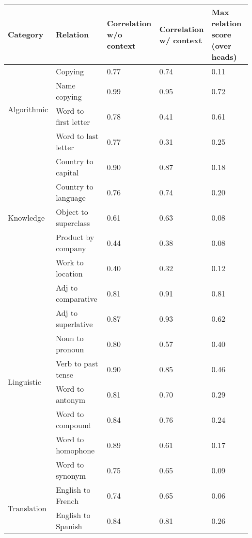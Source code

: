 \begin{tabular}{lllll}
\toprule
Category & Relation & \makecell{Correlation\\w/o context} & \makecell{Correlation\\w/ context} & \makecell{Max relation score\\(over heads)} \\
\midrule
\multirow{4}{*}{Algorithmic} & Copying & 0.77 & 0.74 & 0.11 \\
 & Name copying & 0.99 & 0.95 & 0.72 \\
 & Word to first letter & 0.78 & 0.41 & 0.61 \\
 & Word to last letter & 0.77 & 0.31 & 0.25 \\
\multirow{5}{*}{Knowledge} & Country to capital & 0.90 & 0.87 & 0.18 \\
 & Country to language & 0.76 & 0.74 & 0.20 \\
 & Object to superclass & 0.61 & 0.63 & 0.08 \\
 & Product by company & 0.44 & 0.38 & 0.08 \\
 & Work to location & 0.40 & 0.32 & 0.12 \\
\multirow{8}{*}{Linguistic} & Adj to comparative & 0.81 & 0.91 & 0.81 \\
 & Adj to superlative & 0.87 & 0.93 & 0.62 \\
 & Noun to pronoun & 0.80 & 0.57 & 0.40 \\
 & Verb to past tense & 0.90 & 0.85 & 0.46 \\
 & Word to antonym & 0.81 & 0.70 & 0.29 \\
 & Word to compound & 0.84 & 0.76 & 0.24 \\
 & Word to homophone & 0.89 & 0.61 & 0.17 \\
 & Word to synonym & 0.75 & 0.65 & 0.09 \\
\multirow{2}{*}{Translation} & English to French & 0.74 & 0.65 & 0.06 \\
 & English to Spanish & 0.84 & 0.81 & 0.26 \\
\bottomrule
\end{tabular}
